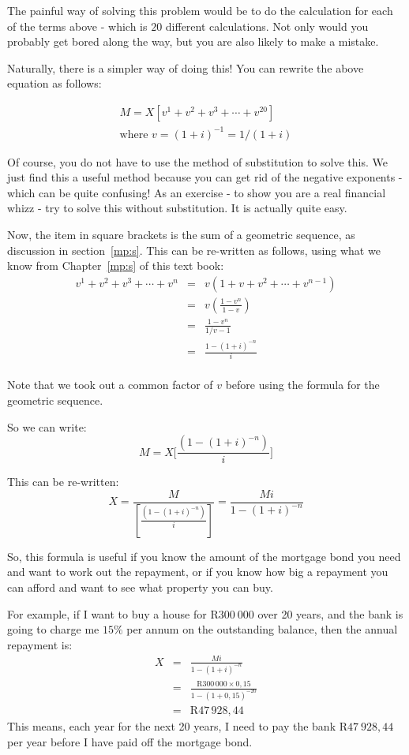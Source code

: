 The painful way of solving this problem would be to do the calculation for each of the terms above - which is $20$ different calculations. Not only would you probably get bored along the way, but you are also likely to make a mistake.

Naturally, there is a simpler way of doing this! You can rewrite the above equation as follows:

\begin{eqnarray*}
M = X[v^1 + v^2 + v^3 + \cdots + v^{20}]\\
\mbox{where $v = (1+i)^{-1} = 1/(1+i)$}
\end{eqnarray*}

Of course, you do not have to use the method of substitution to solve this. We just find this a useful method because you can get rid of the negative exponents - which can be quite confusing! As an exercise - to show you are a real financial whizz - try to solve this without substitution. It is actually quite easy.

Now, the item in square brackets is the sum of a geometric sequence, as discussion in section~\ref{mp:s}. This can be re-written as follows, using what we know from Chapter~\ref{mp:s} of this text book:
\begin{eqnarray*}
v^1 + v^2 + v^3 + \cdots + v^n &=& v(1 + v + v^2 + \cdots + v^{n-1})\\
&=& v\left(\frac{1 - v^n}{1-v}\right)\\
&=& \frac{1 - v^n}{1/v-1}\\
&=& \frac{1-(1+i)^{-n}}{i}\\
\end{eqnarray*}

Note that we took out a common factor of $v$ before using the formula for the geometric sequence.

So we can write:
\begin{equation*}
M = X \biggl[\frac{(1-(1+i)^{-n})}{i}\biggr]
\end{equation*}

This can be re-written:
\begin{equation*}
X = \frac{M}{[\frac{(1-(1+i)^{-n})}{i}]} = \frac{Mi}{1-(1+i)^{-n}}
\end{equation*}

So, this formula is useful if you know the amount of the mortgage bond you need and want to work out the repayment, or if you know how big a repayment you can afford and want to see what property you can buy.

For example, if I want to buy a house for R$300~000$ over 20 years, and the bank is going to charge me $15\%$ per annum on the outstanding balance, then the annual repayment is:
\begin{eqnarray*}
X &=& \frac{Mi}{1-(1+i)^{-n}}\\
&=& \frac{\mbox{R}300\,000 \times 0,15}{1-(1+0,15)^{-20}}\\
&=& \mbox{R}47\,928,44
\end{eqnarray*}
This means, each year for the next 20 years, I need to pay the bank R$47~928,44$ per year before I have paid off the mortgage bond. 

